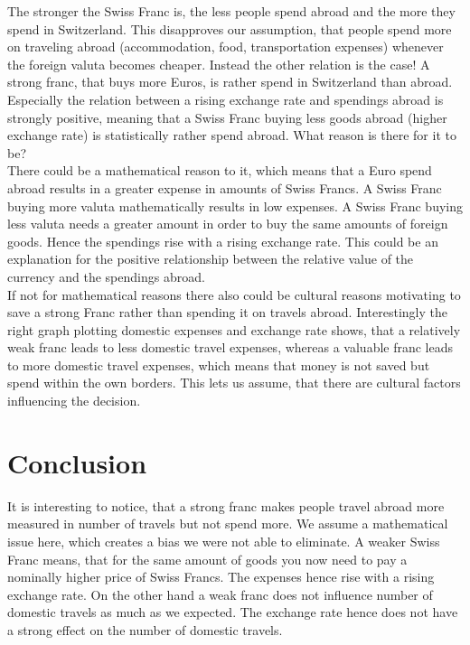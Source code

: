 \documentclass[12pt,a4paper,bibliography=totocnumbered,listof=totocnumbered]{scrartcl}
\begin{document}
The stronger the Swiss Franc is, the less people spend abroad and the more they spend in Switzerland. This disapproves our assumption, that people spend more on traveling abroad (accommodation, food, transportation expenses) whenever the foreign valuta becomes cheaper. Instead the other relation is the case! A strong franc, that buys more Euros, is rather spend in Switzerland than abroad. Especially the relation between a rising exchange rate and spendings abroad is strongly positive, meaning that a Swiss Franc buying less goods abroad (higher exchange rate) is statistically rather spend abroad. What reason is there for it to be?\\ There could be a mathematical reason to it, which means that a Euro spend abroad results in a greater expense in amounts of Swiss Francs. A Swiss Franc buying more valuta mathematically results in low expenses. A Swiss Franc buying less valuta needs a greater amount in order to buy the same amounts of foreign goods. Hence the spendings rise with a rising exchange rate. This could be an explanation for the positive relationship between the relative value of the currency and the spendings abroad.
\ \\
 
 If not for mathematical reasons there also could be cultural reasons motivating to save a strong Franc rather than spending it on travels abroad. Interestingly the right graph plotting domestic expenses and exchange rate shows, that a relatively weak franc leads to less domestic travel expenses, whereas a valuable franc leads to more domestic travel expenses, which means that money is not saved but spend within the own borders. This lets us assume, that there are cultural factors influencing the decision.
\newpage
\section{Conclusion}
It is interesting to notice, that a strong franc makes people travel abroad more measured in number of travels but not spend more. We assume a mathematical issue here, which creates a bias we were not able to eliminate. A weaker Swiss Franc means, that for the same amount of goods you now need to pay a nominally higher price of Swiss Francs. The expenses hence rise with a rising exchange rate. On the other hand a weak franc does not influence number of domestic travels as much as we expected. The exchange rate hence does not have a strong effect on the number of domestic travels. 
\ \\ 
\end{document}
